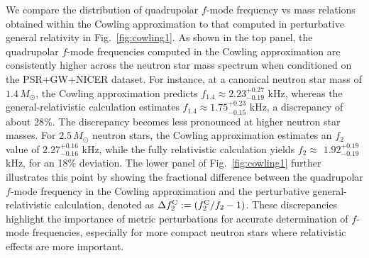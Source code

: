 \documentclass[aps,prd,twocolumn,superscriptaddress,footinbib]{revtex4-1}
\newcommand{\PL}[1]{\textsf{\color{green!80!black}{\textsuperscript{PL}#1}}}
\begin{document}
We compare the distribution of quadrupolar $f$-mode frequency vs mass relations obtained within the Cowling approximation to that computed in perturbative general relativity in Fig.~\ref{fig:cowling1}. As shown in the top panel, the quadrupolar $f$-mode frequencies computed in the Cowling approximation are consistently higher across the neutron star mass spectrum when conditioned on the PSR+GW+NICER dataset. For instance, at a canonical neutron star mass of $ 1.4 \, M_\odot $, the Cowling approximation predicts $ f_{1.4} \approx 2.23^{+0.27}_{-0.19}$ kHz, whereas the general-relativistic calculation estimates $ f_{1.4} \approx 1.75^{+0.23}_{-0.15}$ kHz, a discrepancy of about 28\%. The discrepancy becomes less pronounced at higher neutron star masses. For $ 2.5 \, M_\odot $ neutron stars, the Cowling approximation estimates an $f_2$ value of $2.27^{+0.16}_{-0.16}$ kHz, while the fully relativistic calculation yields $f_2 \approx$ $1.92^{+0.19}_{-0.19}$ kHz, for an 18\% deviation. The lower panel of Fig.~\ref{fig:cowling1} further illustrates this point by showing the fractional difference between the quadrupolar $f$-mode frequency in the Cowling approximation and the perturbative general-relativistic calculation, denoted as $\Delta f_2^{\rm C} := (f_2^{\rm C}/f_2 - 1)$.  These discrepancies highlight the importance of metric perturbations for accurate determination of $f$-mode frequencies, especially for more compact neutron stars where relativistic effects are more important. %

\end{document}
